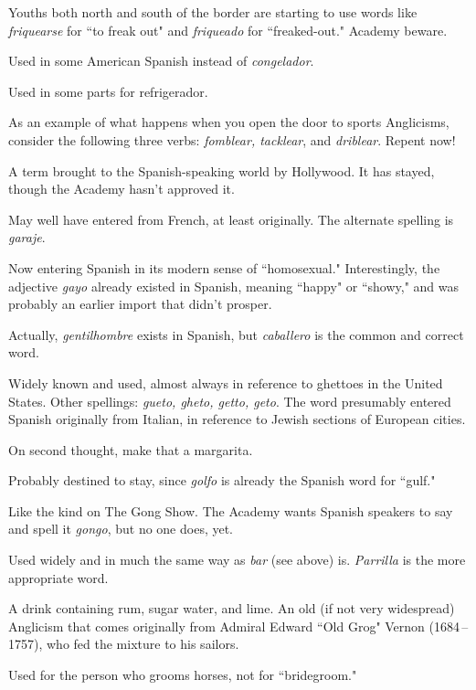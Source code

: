  Youths both north and south of the border are starting to use words like \emph{friquearse} for ``to freak out" and \emph{friqueado} for
``freaked-out." Academy beware.

 Used in some American Spanish instead of
\emph{congelador}.

 Used in some parts for refrigerador.

 As an example of what happens when you open the
door to sports Anglicisms, consider the following three verbs: \emph{fomblear, tacklear}, and \emph{driblear}. Repent now!

 A term brought to the Spanish-speaking world by
Hollywood. It has stayed, though the Academy hasn't approved it.

 May well have entered from French, at least originally. The alternate spelling is \emph{garaje}.

 Now entering Spanish in its modern sense of ``homosexual." Interestingly, the adjective \emph{gayo} already existed in Spanish,
meaning ``happy" or ``showy," and was probably an earlier import that
didn't prosper.

 Actually, \emph{gentilhombre} exists in Spanish, but
\emph{caballero} is the common and correct word.

 Widely known and used, almost always in reference
to ghettoes in the United States. Other spellings: \emph{gueto, gheto, getto,
	geto}. The word presumably entered Spanish originally from Italian, in
reference to Jewish sections of European cities.

 On second thought, make that a margarita.

 Probably destined to stay, since \emph{golfo} is already the
Spanish word for ``gulf."

 Like the kind on The Gong Show. The Academy
wants Spanish speakers to say and spell it \emph{gongo}, but no one does, yet.

 Used widely and in much the same way as \emph{bar} (see
above) is. \emph{Parrilla} is the more appropriate word.

 A drink containing rum, sugar water, and lime. An old
(if not very widespread) Anglicism that comes originally from Admiral
Edward ``Old Grog" Vernon (1684\,--1757), who fed the mixture to his
sailors.

 Used for the person who grooms horses, not for
``bridegroom."

